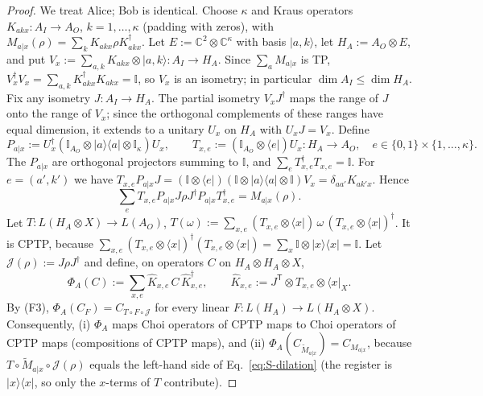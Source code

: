\documentclass[aps,pra,onecolumn,notitlepage,superscriptaddress,longbibliography,nofootinbib,11pt]{revtex4-2}
\theoremstyle{remark}
\newcommand{\ket}[1]{\lvert #1\rangle}
\newcommand{\bra}[1]{\langle #1\rvert}
\newcommand{\one}{\mathbb{I}}
\newcommand{\tp}{\mathsf{T}}
\newcommand{\CC}{\mathbb{C}}
\begin{document}
\begin{proof}
We treat Alice; Bob is identical. Choose $\kappa$ and Kraus operators $K_{akx}:A_I\to A_O$, $k=1,\dots,\kappa$ (padding with zeros), with $M_{a|x}(\rho)=\sum_kK_{akx}\rho K_{akx}^\dagger$. Let $E:=\CC^2\otimes\CC^\kappa$ with basis $\ket{a,k}$, let $H_A:=A_O\otimes E$, and put $V_x:=\sum_{a,k}K_{akx}\otimes\ket{a,k}:A_I\to H_A$. Since $\sum_aM_{a|x}$ is TP, $V_x^\dagger V_x=\sum_{a,k}K_{akx}^\dagger K_{akx}=\one$, so $V_x$ is an isometry; in particular $\dim A_I\le\dim H_A$. Fix any isometry $J:A_I\to H_A$. The partial isometry $V_xJ^\dagger$ maps the range of $J$ onto the range of $V_x$; since the orthogonal complements of these ranges have equal dimension, it extends to a unitary $U_x$ on $H_A$ with $U_xJ=V_x$. Define
\begin{equation}
P_{a|x}:=U_x^\dagger(\one_{A_O}\otimes\ket{a}\bra{a}\otimes\one_\kappa)U_x,\qquad
T_{x,e}:=(\one_{A_O}\otimes\bra{e})U_x:H_A\to A_O,\quad e\in\{0,1\}\times\{1,\dots,\kappa\}.
\end{equation}
The $P_{a|x}$ are orthogonal projectors summing to $\one$, and $\sum_eT_{x,e}^\dagger T_{x,e}=\one$. For $e=(a',k')$ we have $T_{x,e}P_{a|x}J=(\one\otimes\bra{e})(\one\otimes\ket{a}\bra{a}\otimes\one)V_x=\delta_{aa'}K_{ak'x}$. Hence
\begin{equation}
\sum_eT_{x,e}P_{a|x}J\rho J^\dagger P_{a|x}T_{x,e}^\dagger=M_{a|x}(\rho).
\label{eq:S-dilation}
\end{equation}
Let $T:L(H_A\otimes X)\to L(A_O)$, $T(\omega):=\sum_{x,e}(T_{x,e}\otimes\bra{x})\,\omega\,(T_{x,e}\otimes\bra{x})^\dagger$. It is CPTP, because $\sum_{x,e}(T_{x,e}\otimes\bra{x})^\dagger(T_{x,e}\otimes\bra{x})=\sum_x\one\otimes\ket{x}\bra{x}=\one$. Let $\mathcal J(\rho):=J\rho J^\dagger$ and define, on operators $C$ on $H_A\otimes H_A\otimes X$,
\begin{equation}
\Phi_A(C):=\sum_{x,e}\hat K_{x,e}\,C\,\hat K_{x,e}^\dagger,\qquad \hat K_{x,e}:=J^\tp\otimes T_{x,e}\otimes\bra{x}_X .
\end{equation}
By (F3), $\Phi_A(C_F)=C_{T\circ F\circ\mathcal J}$ for every linear $F:L(H_A)\to L(H_A\otimes X)$. Consequently, (i) $\Phi_A$ maps Choi operators of CPTP maps to Choi operators of CPTP maps (compositions of CPTP maps), and (ii) $\Phi_A(C_{\widetilde M_{a|x}})=C_{M_{a|x}}$, because $T\circ\widetilde M_{a|x}\circ\mathcal J(\rho)$ equals the left-hand side of Eq.~\eqref{eq:S-dilation} (the register is $\ket{x}\bra{x}$, so only the $x$-terms of $T$ contribute).


\end{proof}
\end{document}
